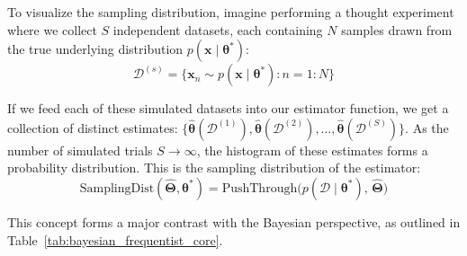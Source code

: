 \documentclass{article}
\begin{document}
To visualize the sampling distribution, imagine performing a thought experiment where we collect $S$ independent datasets, each containing $N$ samples drawn from the true underlying distribution $p(\mathbf{x} \mid \boldsymbol{\theta}^*)$:
\begin{equation}
\mathcal{D}^{(s)} = \{\mathbf{x}_n \sim p(\mathbf{x} \mid \boldsymbol{\theta}^*) : n = 1 : N\}
\end{equation}

If we feed each of these simulated datasets into our estimator function, we get a collection of distinct estimates: $\{\hat{\boldsymbol{\theta}}(\mathcal{D}^{(1)}), \hat{\boldsymbol{\theta}}(\mathcal{D}^{(2)}), \dots, \hat{\boldsymbol{\theta}}(\mathcal{D}^{(S)})\}$. As the number of simulated trials $S \to \infty$, the histogram of these estimates forms a probability distribution. This is the sampling distribution of the estimator:
\begin{equation}
\text{SamplingDist}(\hat{\boldsymbol{\Theta}}, \boldsymbol{\theta}^*) = \text{PushThrough}\big(p(\mathcal{D} \mid \boldsymbol{\theta}^*), \, \hat{\boldsymbol{\Theta}}\big)
\end{equation}

This concept forms a major contrast with the Bayesian perspective, as outlined in Table~\ref{tab:bayesian_frequentist_core}.

\begin{table}[htbp]
\centering
\small
\renewcommand{\arraystretch}{1.4}
\caption{Core Conceptual Groundwork: Bayesian vs. Frequentist Frameworks}
\label{tab:bayesian_frequentist_core}
\end{table}
\end{document}
